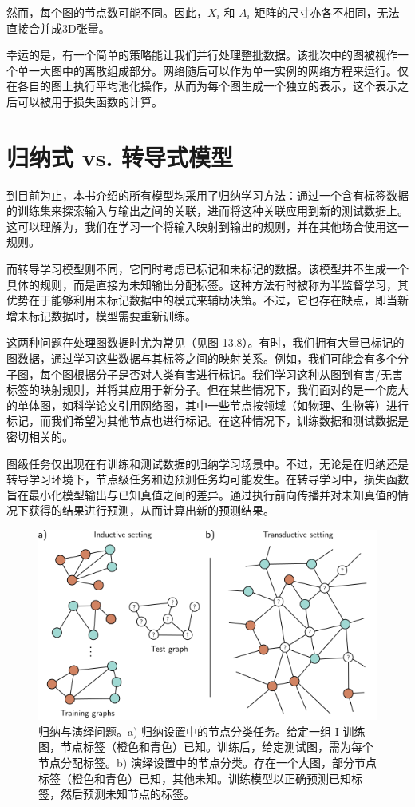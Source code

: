 然而，每个图的节点数可能不同。因此，\(X_i\) 和 \(A_i\) 矩阵的尺寸亦各不相同，无法直接合并成3D张量。

幸运的是，有一个简单的策略能让我们并行处理整批数据。该批次中的图被视作一个单一大图中的离散组成部分。网络随后可以作为单一实例的网络方程来运行。仅在各自的图上执行平均池化操作，从而为每个图生成一个独立的表示，这个表示之后可以被用于损失函数的计算。
\section{归纳式 vs. 转导式模型}
到目前为止，本书介绍的所有模型均采用了归纳学习方法：通过一个含有标签数据的训练集来探索输入与输出之间的关联，进而将这种关联应用到新的测试数据上。这可以理解为，我们在学习一个将输入映射到输出的规则，并在其他场合使用这一规则。

而转导学习模型则不同，它同时考虑已标记和未标记的数据。该模型并不生成一个具体的规则，而是直接为未知输出分配标签。这种方法有时被称为半监督学习，其优势在于能够利用未标记数据中的模式来辅助决策。不过，它也存在缺点，即当新增未标记数据时，模型需要重新训练。

这两种问题在处理图数据时尤为常见（见图 13.8）。有时，我们拥有大量已标记的图数据，通过学习这些数据与其标签之间的映射关系。例如，我们可能会有多个分子图，每个图根据分子是否对人类有害进行标记。我们学习这种从图到有害/无害标签的映射规则，并将其应用于新分子。但在某些情况下，我们面对的是一个庞大的单体图，如科学论文引用网络图，其中一些节点按领域（如物理、生物等）进行标记，而我们希望为其他节点也进行标记。在这种情况下，训练数据和测试数据是密切相关的。

图级任务仅出现在有训练和测试数据的归纳学习场景中。不过，无论是在归纳还是转导学习环境下，节点级任务和边预测任务均可能发生。在转导学习中，损失函数旨在最小化模型输出与已知真值之间的差异。通过执行前向传播并对未知真值的情况下获得的结果进行预测，从而计算出新的预测结果。

\begin{figure}[ht!]
\centering
\includegraphics[width=0.7\linewidth]{png/chapter13/GraphInductiveTransductive.png}
\caption{归纳与演绎问题。a) 归纳设置中的节点分类任务。给定一组 I 训练图，节点标签（橙色和青色）已知。训练后，给定测试图，需为每个节点分配标签。b) 演绎设置中的节点分类。存在一个大图，部分节点标签（橙色和青色）已知，其他未知。训练模型以正确预测已知标签，然后预测未知节点的标签。}
\end{figure}

